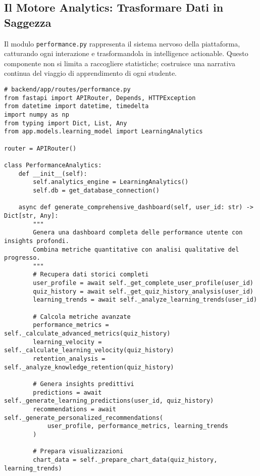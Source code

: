 \documentclass[a4paper, 14pt, oneside]{extbook}
\begin{document}
\subsection{Il Motore Analytics: Trasformare Dati in Saggezza}

Il modulo \texttt{performance.py} rappresenta il sistema nervoso della piattaforma, catturando ogni interazione e trasformandola in intelligence actionable. Questo componente non si limita a raccogliere statistiche; costruisce una narrativa continua del viaggio di apprendimento di ogni studente.

\begin{lstlisting}[style=pythonstyle, caption=Sistema Analytics Avanzato, label=lst:analytics-engine]
# backend/app/routes/performance.py
from fastapi import APIRouter, Depends, HTTPException
from datetime import datetime, timedelta
import numpy as np
from typing import Dict, List, Any
from app.models.learning_model import LearningAnalytics

router = APIRouter()

class PerformanceAnalytics:
    def __init__(self):
        self.analytics_engine = LearningAnalytics()
        self.db = get_database_connection()
        
    async def generate_comprehensive_dashboard(self, user_id: str) -> Dict[str, Any]:
        """
        Genera una dashboard completa delle performance utente con insights profondi.
        Combina metriche quantitative con analisi qualitative del progresso.
        """
        # Recupera dati storici completi
        user_profile = await self._get_complete_user_profile(user_id)
        quiz_history = await self._get_quiz_history_analysis(user_id)
        learning_trends = await self._analyze_learning_trends(user_id)
        
        # Calcola metriche avanzate
        performance_metrics = self._calculate_advanced_metrics(quiz_history)
        learning_velocity = self._calculate_learning_velocity(quiz_history)
        retention_analysis = self._analyze_knowledge_retention(quiz_history)
        
        # Genera insights predittivi
        predictions = await self._generate_learning_predictions(user_id, quiz_history)
        recommendations = await self._generate_personalized_recommendations(
            user_profile, performance_metrics, learning_trends
        )
        
        # Prepara visualizzazioni
        chart_data = self._prepare_chart_data(quiz_history, learning_trends)
        

\end{lstlisting}
\end{document}
